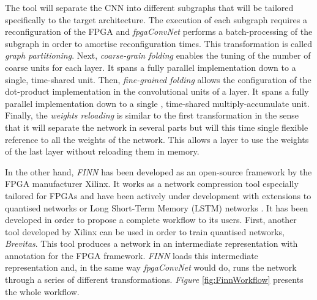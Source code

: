 The tool will separate the CNN into different subgraphs that will be tailored specifically to the target architecture. The execution of each subgraph requires a reconfiguration of the FPGA and \emph{fpgaConvNet} performs a batch-processing of the subgraph in order to amortise reconfiguration times. This transformation is called \emph{graph partitioning}. Next, \emph{coarse-grain folding} enables the tuning of the number of coarse units for each layer. It spans a fully parallel implementation down to a single, time-shared unit. Then, \emph{fine-grained folding} allows the configuration of the dot-product implementation in the convolutional units of a layer. It spans a fully parallel implementation down to a single , time-shared multiply-accumulate unit. Finally, the \emph{weights reloading} is similar to the first transformation in the sense that it will separate the network in several parts but will this time single flexible reference to all the weights of the network. This allows a layer to use the weights of the last layer without reloading them in memory.

In the other hand, \emph{FINN} \cite{Umuroglu2017a} has been developed as an open-source framework by the FPGA manufacturer Xilinx. It works as a network compression tool especially tailored for FPGAs and have been actively under development with extensions to quantised networks \cite{Blott2018} or Long Short-Term Memory (LSTM) networks \cite{Rybalkin2018}. It has been developed in order to propose a complete workflow to its users. First, another tool developed by Xilinx can be used in order to train quantised networks, \emph{Brevitas}. This tool produces a network in an intermediate representation with annotation for the FPGA framework. \emph{FINN} loads this intermediate representation and, in the same way \emph{fpgaConvNet} would do, runs the network through a series of different transformations. \emph{Figure} \ref{fig:FinnWorkflow} presents the whole workflow.

